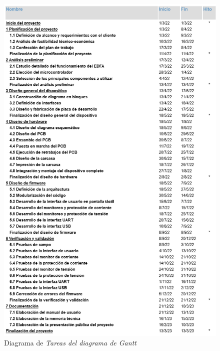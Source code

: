 \documentclass[
11pt, %
]{charter}
\begin{document}
\begin{figure}[H]
\centering 
\includegraphics[width=.85\textwidth]{./Figuras/Gantt_Tareas.png}
\caption{Diagrama de \textit{Tareas del diagrama de Gantt}}
\label{fig:Gantt_Tareas}
\end{figure}
\end{document}

